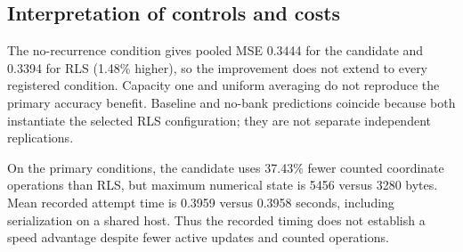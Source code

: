 \subsection{Interpretation of controls and costs}
The no-recurrence condition gives pooled MSE 0.3444 for the candidate and 0.3394 for RLS (1.48\% higher), so the improvement does not extend to every registered condition. Capacity one and uniform averaging do not reproduce the primary accuracy benefit. Baseline and no-bank predictions coincide because both instantiate the selected RLS configuration; they are not separate independent replications.

On the primary conditions, the candidate uses 37.43\% fewer counted coordinate operations than RLS, but maximum numerical state is 5456 versus 3280 bytes. Mean recorded attempt time is 0.3959 versus 0.3958 seconds, including serialization on a shared host. Thus the recorded timing does not establish a speed advantage despite fewer active updates and counted operations.
